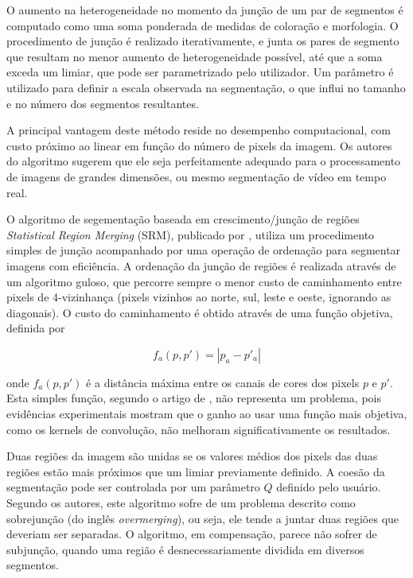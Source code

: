 O aumento na heterogeneidade no momento da junção de um par de segmentos é computado como uma soma ponderada de medidas de coloração e morfologia. O procedimento de junção é realizado iterativamente, e  junta os pares de segmento que resultam no menor aumento de heterogeneidade possível, até que a soma exceda um limiar, que pode ser parametrizado pelo utilizador. Um parâmetro é utilizado para definir a escala observada na segmentação, o que influi no tamanho e no número dos segmentos resultantes.

A principal vantagem deste método reside no desempenho computacional, com custo próximo ao linear em função do número de pixels da imagem. Os autores do algoritmo sugerem que ele seja perfeitamente adequado para o processamento de imagens de grandes dimensões, ou mesmo segmentação de vídeo em tempo real.


O algoritmo de segementação baseada em crescimento/junção de regiões \textit{Statistical Region Merging} (SRM), publicado por , utiliza um procedimento simples de junção acompanhado por uma operação de ordenação para segmentar imagens com eficiência. A ordenação da junção de regiões é realizada através de um algoritmo guloso, que percorre sempre o menor custo de caminhamento entre pixels de 4-vizinhança (pixels vizinhos ao norte, sul, leste e oeste, ignorando as diagonais). O custo do caminhamento é obtido através de uma função objetiva, definida por

\begin{equation}
	\displaystyle f_a(p, p') = |p_a - p'_a|
\end{equation}

onde $f_a(p, p')$ é a distância máxima entre os canais de cores dos pixels $p$ e $p'$. Esta simples função, segundo o artigo de , não representa um problema, pois evidências experimentais mostram que o ganho ao usar uma função mais objetiva, como os kernels de convolução, não melhoram significativamente os resultados.

Duas regiões da imagem são unidas se os valores médios dos pixels das duas regiões estão mais próximos que um limiar previamente definido. A coesão da segmentação pode ser controlada por um parâmetro $Q$ definido pelo usuário. Segundo os autores, este algoritmo sofre de um problema descrito como sobrejunção (do inglês \textit{overmerging}), ou seja, ele tende a juntar duas regiões que deveriam ser separadas. O algoritmo, em compensação, parece não sofrer de subjunção, quando uma região é desnecessariamente dividida em diversos segmentos.

